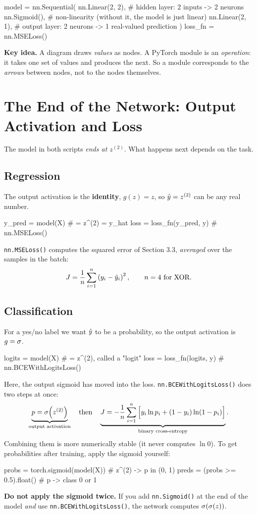 \documentclass[12pt, a4paper]{article}
\begin{document}
\begin{codebox}
model = nn.Sequential(
    nn.Linear(2, 2),  # hidden layer: 2 inputs -> 2 neurons
    nn.Sigmoid(),     # non-linearity (without it, the model is just linear)
    nn.Linear(2, 1),  # output layer: 2 neurons -> 1 real-valued prediction
)
loss_fn = nn.MSELoss()
\end{codebox}

\begin{notebox}
  \textbf{Key idea.} A diagram draws \emph{values} as nodes. A PyTorch module
  is an \emph{operation}: it takes one set of values and produces the next.
  So a module corresponds to the \emph{arrows} between nodes, not to the
  nodes themselves.
\end{notebox}

\section{The End of the Network: Output Activation and Loss}

The model in both scripts \emph{ends at $z^{(2)}$}. What happens next
depends on the task.

\subsection{Regression}

The output activation is the \textbf{identity}, $g(z) = z$, so
$\hat{y} = z^{(2)}$ can be any real number.
\begin{codebox}
y_pred = model(X)          # = z^(2) = y_hat
loss = loss_fn(y_pred, y)  # nn.MSELoss()
\end{codebox}
\texttt{nn.MSELoss()} computes the squared error of Section 3.3,
\emph{averaged} over the samples in the batch:
\[
  J = \frac{1}{n}\sum_{i=1}^{n} \left(y_i - \hat{y}_i\right)^2,
  \qquad n = 4 \text{ for XOR.}
\]

\subsection{Classification}

For a yes/no label we want $\hat{y}$ to be a probability, so the output
activation is $g = \sigma$.
\begin{codebox}
logits = model(X)          # = z^(2), called a "logit"
loss = loss_fn(logits, y)  # nn.BCEWithLogitsLoss()
\end{codebox}
Here, the output sigmoid has moved into the loss.
\texttt{nn.BCEWithLogitsLoss()} does two steps at once:
\[
  \underbrace{p = \sigma\!\left(z^{(2)}\right)}_{\text{output activation}}
  \quad\text{then}\quad
  \underbrace{J = -\frac{1}{n}\sum_{i=1}^{n}
    \Big[y_i \ln p_i + (1-y_i)\ln(1-p_i)\Big]}_{\text{binary cross-entropy}}.
\]
Combining them is more numerically stable (it never computes $\ln 0$). To get probabilities after training, apply the sigmoid yourself:
\begin{codebox}
probs = torch.sigmoid(model(X))  # z^(2) -> p in (0, 1)
preds = (probs >= 0.5).float()   # p -> class 0 or 1
\end{codebox}

\begin{warnbox}
  \textbf{Do not apply the sigmoid twice.} If you add \texttt{nn.Sigmoid()}
  at the end of the model \emph{and} use \texttt{nn.BCEWithLogitsLoss()},
  the network computes $\sigma(\sigma(z))$.
\end{warnbox}
\end{document}

